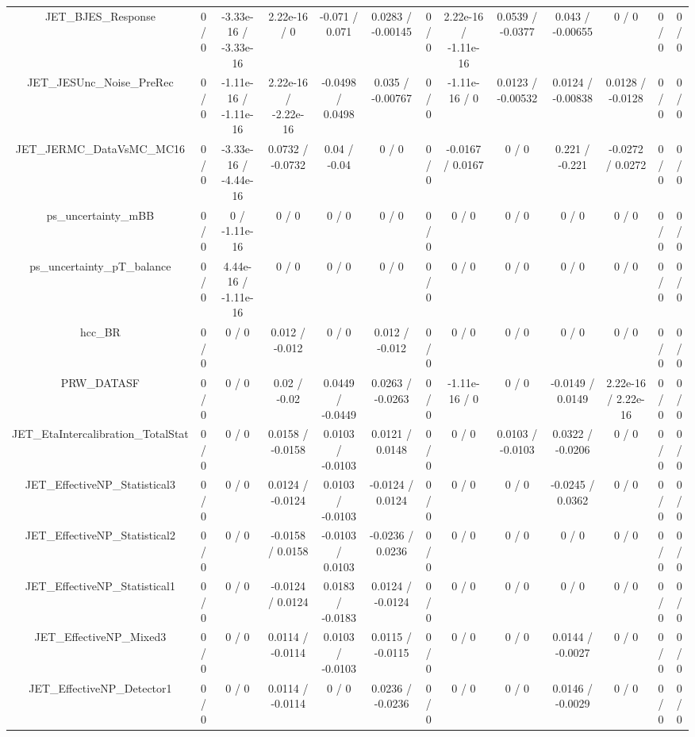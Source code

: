 \documentclass[10pt]{article}
\begin{document}
\begin{table}[htbp]
\begin{center}
\begin{tabular}{|c|c|c|c|c|c|c|c|c|c|c|c|c|}
  JET_BJES_Response & 0 / 0 & -3.33e-16 / -3.33e-16 & 2.22e-16 / 0 & -0.071 / 0.071 & 0.0283 / -0.00145 & 0 / 0 & 2.22e-16 / -1.11e-16 & 0.0539 / -0.0377 & 0.043 / -0.00655 & 0 / 0 & 0 / 0 & 0 / 0 \\ 
  JET_JESUnc_Noise_PreRec & 0 / 0 & -1.11e-16 / -1.11e-16 & 2.22e-16 / -2.22e-16 & -0.0498 / 0.0498 & 0.035 / -0.00767 & 0 / 0 & -1.11e-16 / 0 & 0.0123 / -0.00532 & 0.0124 / -0.00838 & 0.0128 / -0.0128 & 0 / 0 & 0 / 0 \\ 
  JET_JERMC_DataVsMC_MC16 & 0 / 0 & -3.33e-16 / -4.44e-16 & 0.0732 / -0.0732 & 0.04 / -0.04 & 0 / 0 & 0 / 0 & -0.0167 / 0.0167 & 0 / 0 & 0.221 / -0.221 & -0.0272 / 0.0272 & 0 / 0 & 0 / 0 \\ 
  ps_uncertainty_mBB & 0 / 0 & 0 / -1.11e-16 & 0 / 0 & 0 / 0 & 0 / 0 & 0 / 0 & 0 / 0 & 0 / 0 & 0 / 0 & 0 / 0 & 0 / 0 & 0 / 0 \\ 
  ps_uncertainty_pT_balance & 0 / 0 & 4.44e-16 / -1.11e-16 & 0 / 0 & 0 / 0 & 0 / 0 & 0 / 0 & 0 / 0 & 0 / 0 & 0 / 0 & 0 / 0 & 0 / 0 & 0 / 0 \\ 
  hcc_BR & 0 / 0 & 0 / 0 & 0.012 / -0.012 & 0 / 0 & 0.012 / -0.012 & 0 / 0 & 0 / 0 & 0 / 0 & 0 / 0 & 0 / 0 & 0 / 0 & 0 / 0 \\ 
  PRW_DATASF & 0 / 0 & 0 / 0 & 0.02 / -0.02 & 0.0449 / -0.0449 & 0.0263 / -0.0263 & 0 / 0 & -1.11e-16 / 0 & 0 / 0 & -0.0149 / 0.0149 & 2.22e-16 / 2.22e-16 & 0 / 0 & 0 / 0 \\ 
  JET_EtaIntercalibration_TotalStat & 0 / 0 & 0 / 0 & 0.0158 / -0.0158 & 0.0103 / -0.0103 & 0.0121 / 0.0148 & 0 / 0 & 0 / 0 & 0.0103 / -0.0103 & 0.0322 / -0.0206 & 0 / 0 & 0 / 0 & 0 / 0 \\ 
  JET_EffectiveNP_Statistical3 & 0 / 0 & 0 / 0 & 0.0124 / -0.0124 & 0.0103 / -0.0103 & -0.0124 / 0.0124 & 0 / 0 & 0 / 0 & 0 / 0 & -0.0245 / 0.0362 & 0 / 0 & 0 / 0 & 0 / 0 \\ 
  JET_EffectiveNP_Statistical2 & 0 / 0 & 0 / 0 & -0.0158 / 0.0158 & -0.0103 / 0.0103 & -0.0236 / 0.0236 & 0 / 0 & 0 / 0 & 0 / 0 & 0 / 0 & 0 / 0 & 0 / 0 & 0 / 0 \\ 
  JET_EffectiveNP_Statistical1 & 0 / 0 & 0 / 0 & -0.0124 / 0.0124 & 0.0183 / -0.0183 & 0.0124 / -0.0124 & 0 / 0 & 0 / 0 & 0 / 0 & 0 / 0 & 0 / 0 & 0 / 0 & 0 / 0 \\ 
  JET_EffectiveNP_Mixed3 & 0 / 0 & 0 / 0 & 0.0114 / -0.0114 & 0.0103 / -0.0103 & 0.0115 / -0.0115 & 0 / 0 & 0 / 0 & 0 / 0 & 0.0144 / -0.0027 & 0 / 0 & 0 / 0 & 0 / 0 \\ 
  JET_EffectiveNP_Detector1 & 0 / 0 & 0 / 0 & 0.0114 / -0.0114 & 0 / 0 & 0.0236 / -0.0236 & 0 / 0 & 0 / 0 & 0 / 0 & 0.0146 / -0.0029 & 0 / 0 & 0 / 0 & 0 / 0 \\ 

\end{tabular}
\end{center}
\end{table}
\end{document}
